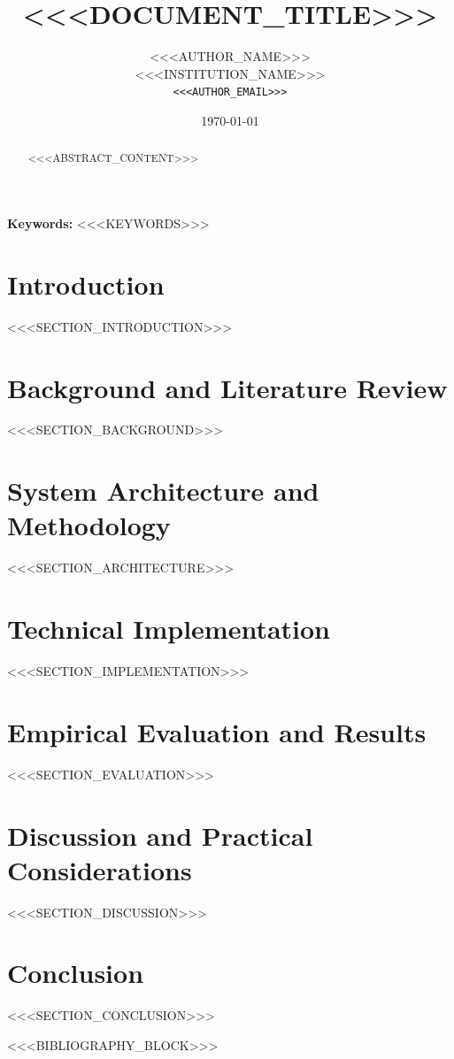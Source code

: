 \documentclass[11pt,a4paper,onecolumn]{llncs}
\title{\textbf{<<<DOCUMENT_TITLE>>>}}
\author{<<<AUTHOR_NAME>>> \\ \small <<<INSTITUTION_NAME>>> \\ \small \texttt{<<<AUTHOR_EMAIL>>>}}
\date{\today}
\begin{document}
\maketitle

\begin{abstract}
<<<ABSTRACT_CONTENT>>>
\end{abstract}

\textbf{Keywords:} <<<KEYWORDS>>>

\section{Introduction}
<<<SECTION_INTRODUCTION>>>

\section{Background and Literature Review}
<<<SECTION_BACKGROUND>>>

\section{System Architecture and Methodology}
<<<SECTION_ARCHITECTURE>>>

\section{Technical Implementation}
<<<SECTION_IMPLEMENTATION>>>

\section{Empirical Evaluation and Results}
<<<SECTION_EVALUATION>>>

\section{Discussion and Practical Considerations}
<<<SECTION_DISCUSSION>>>

\section{Conclusion}
<<<SECTION_CONCLUSION>>>

<<<BIBLIOGRAPHY_BLOCK>>>
\end{document}
